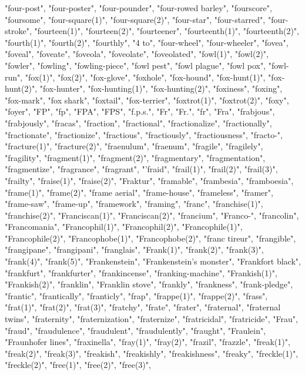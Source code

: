 "four-post",
"four-poster",
"four-pounder",
"four-rowed barley",
"fourscore",
"foursome",
"four-square(1)",
"four-square(2)",
"four-star",
"four-starred",
"four-stroke",
"fourteen(1)",
"fourteen(2)",
"fourteener",
"fourteenth(1)",
"fourteenth(2)",
"fourth(1)",
"fourth(2)",
"fourthly",
"4 to",
"four-wheel",
"four-wheeler",
"fovea",
"foveal",
"foveate",
"foveola",
"foveolate",
"foveolated",
"fowl(1)",
"fowl(2)",
"fowler",
"fowling",
"fowling-piece",
"fowl pest",
"fowl plague",
"fowl pox",
"fowl-run",
"fox(1)",
"fox(2)",
"fox-glove",
"foxhole",
"fox-hound",
"fox-hunt(1)",
"fox-hunt(2)",
"fox-hunter",
"fox-hunting(1)",
"fox-hunting(2)",
"foxiness",
"foxing",
"fox-mark",
"fox shark",
"foxtail",
"fox-terrier",
"foxtrot(1)",
"foxtrot(2)",
"foxy",
"foyer",
"FP",
"fp",
"FPA",
"FPS",
"f.p.s.",
"Fr",
"Fr.",
"fr",
"Fra",
"frabjous",
"frabjously",
"fracas",
"fraction",
"fractional",
"fractionalize",
"fractionally",
"fractionate",
"fractionize",
"fractious",
"fractiously",
"fractiousness",
"fracto-",
"fracture(1)",
"fracture(2)",
"fraenulum",
"fraenum",
"fragile",
"fragilely",
"fragility",
"fragment(1)",
"fragment(2)",
"fragmentary",
"fragmentation",
"fragmentize",
"fragrance",
"fragrant",
"'fraid",
"frail(1)",
"frail(2)",
"frail(3)",
"frailty",
"fraise(1)",
"fraise(2)",
"Fraktur",
"framable",
"frambesia",
"framboesia",
"frame(1)",
"frame(2)",
"frame aerial",
"frame-house",
"frameless",
"framer",
"frame-saw",
"frame-up",
"framework",
"framing",
"franc",
"franchise(1)",
"franchise(2)",
"Franciscan(1)",
"Franciscan(2)",
"francium",
"Franco-",
"francolin",
"Francomania",
"Francophil(1)",
"Francophil(2)",
"Francophile(1)",
"Francophile(2)",
"Francophobe(1)",
"Francophobe(2)",
"franc tireur",
"frangible",
"frangipane",
"frangipani",
"franglais",
"Frank(1)",
"frank(2)",
"frank(3)",
"frank(4)",
"frank(5)",
"Frankenstein",
"Frankenstein's monster",
"Frankfort black",
"frankfurt",
"frankfurter",
"frankincense",
"franking-machine",
"Frankish(1)",
"Frankish(2)",
"franklin",
"Franklin stove",
"frankly",
"frankness",
"frank-pledge",
"frantic",
"frantically",
"franticly",
"frap",
"frappe(1)",
"frappe(2)",
"frass",
"frat(1)",
"frat(2)",
"frat(3)",
"fratchy",
"frate",
"frater",
"fraternal",
"fraternal twins",
"fraternity",
"fraternization",
"fraternize",
"fratricidal",
"fratricide",
"Frau",
"fraud",
"fraudulence",
"fraudulent",
"fraudulently",
"fraught",
"Fraulein",
"Fraunhofer lines",
"fraxinella",
"fray(1)",
"fray(2)",
"frazil",
"frazzle",
"freak(1)",
"freak(2)",
"freak(3)",
"freakish",
"freakishly",
"freakishness",
"freaky",
"freckle(1)",
"freckle(2)",
"free(1)",
"free(2)",
"free(3)",

